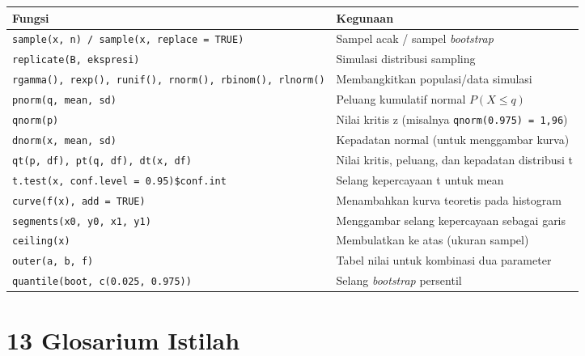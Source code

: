 \documentclass[
  indonesian,
  letterpaper,
]{book}
\newcounter{none} %
\begin{document}
{\def\LTcaptype{none} %
\begin{longtable}[]{@{}
  >{\raggedright\arraybackslash}p{}
  >{\raggedright\arraybackslash}p{}@{}}
\toprule\noalign{}
\begin{minipage}[b]{\linewidth}\raggedright
Fungsi
\end{minipage} & \begin{minipage}[b]{\linewidth}\raggedright
Kegunaan
\end{minipage} \\
\midrule\noalign{}
\endhead
\bottomrule\noalign{}
\endlastfoot
\texttt{sample(x,\ n)\ /\ sample(x,\ replace\ =\ TRUE)} & Sampel acak /
sampel \emph{bootstrap} \\
\texttt{replicate(B,\ ekspresi)} & Simulasi distribusi sampling \\
\texttt{rgamma(),\ rexp(),\ runif(),\ rnorm(),\ rbinom(),\ rlnorm()} &
Membangkitkan populasi/data simulasi \\
\texttt{pnorm(q,\ mean,\ sd)} & Peluang kumulatif normal
\(P(X \le q)\) \\
\texttt{qnorm(p)} & Nilai kritis z (misalnya
\texttt{qnorm(0.975)\ =\ 1,96}) \\
\texttt{dnorm(x,\ mean,\ sd)} & Kepadatan normal (untuk menggambar
kurva) \\
\texttt{qt(p,\ df),\ pt(q,\ df),\ dt(x,\ df)} & Nilai kritis, peluang,
dan kepadatan distribusi t \\
\texttt{t.test(x,\ conf.level\ =\ 0.95)\$conf.int} & Selang kepercayaan
t untuk mean \\
\texttt{curve(f(x),\ add\ =\ TRUE)} & Menambahkan kurva teoretis pada
histogram \\
\texttt{segments(x0,\ y0,\ x1,\ y1)} & Menggambar selang kepercayaan
sebagai garis \\
\texttt{ceiling(x)} & Membulatkan ke atas (ukuran sampel) \\
\texttt{outer(a,\ b,\ f)} & Tabel nilai untuk kombinasi dua parameter \\
\texttt{quantile(boot,\ c(0.025,\ 0.975))} & Selang \emph{bootstrap}
persentil \\
\end{longtable}
}


\chapter{13 Glosarium Istilah}\label{glosarium-istilah}
\end{document}
